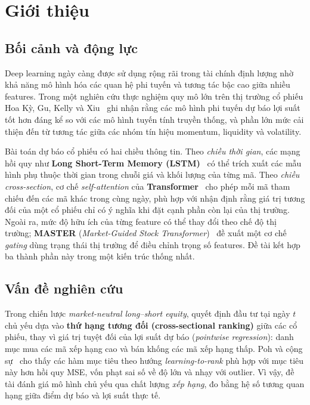 \documentclass[a4paper,12pt]{article}
\begin{document}
\section{Giới thiệu}\label{sec:introduction}

\subsection{Bối cảnh và động lực}
Deep learning ngày càng được sử dụng rộng rãi trong tài chính định lượng nhờ khả năng mô hình hóa các quan hệ phi tuyến và tương tác bậc cao giữa nhiều features. Trong một nghiên cứu thực nghiệm quy mô lớn trên thị trường cổ phiếu Hoa Kỳ, Gu, Kelly và Xiu~\cite{Gu2020} ghi nhận rằng các mô hình phi tuyến dự báo lợi suất tốt hơn đáng kể so với các mô hình tuyến tính truyền thống, và phần lớn mức cải thiện đến từ tương tác giữa các nhóm tín hiệu momentum, liquidity và volatility.

Bài toán dự báo cổ phiếu có hai chiều thông tin. Theo \emph{chiều thời gian}, các mạng hồi quy như \textbf{Long Short-Term Memory (LSTM)}~\cite{FischerKrauss2018} có thể trích xuất các mẫu hình phụ thuộc thời gian trong chuỗi giá và khối lượng của từng mã. Theo \emph{chiều cross-section}, cơ chế \textit{self-attention} của \textbf{Transformer}~\cite{Vaswani2017} cho phép mỗi mã tham chiếu đến các mã khác trong cùng ngày, phù hợp với nhận định rằng giá trị tương đối của một cổ phiếu chỉ có ý nghĩa khi đặt cạnh phần còn lại của thị trường. Ngoài ra, mức độ hữu ích của từng feature có thể thay đổi theo chế độ thị trường; \textbf{MASTER} (\textit{Market-Guided Stock Transformer})~\cite{Li2024MASTER} đề xuất một cơ chế \textit{gating} dùng trạng thái thị trường để điều chỉnh trọng số features. Đề tài kết hợp ba thành phần này trong một kiến trúc thống nhất.

\subsection{Vấn đề nghiên cứu}
Trong chiến lược \textit{market-neutral long--short equity}, quyết định đầu tư tại ngày $t$ chủ yếu dựa vào \textbf{thứ hạng tương đối (cross-sectional ranking)} giữa các cổ phiếu, thay vì giá trị tuyệt đối của lợi suất dự báo (\textit{pointwise regression}): danh mục mua các mã xếp hạng cao và bán khống các mã xếp hạng thấp. Poh và cộng sự~\cite{Poh2021} cho thấy các hàm mục tiêu theo hướng \textit{learning-to-rank} phù hợp với mục tiêu này hơn hồi quy MSE, vốn phạt sai số về độ lớn và nhạy với outlier. Vì vậy, đề tài đánh giá mô hình chủ yếu qua chất lượng \emph{xếp hạng}, đo bằng hệ số tương quan hạng giữa điểm dự báo và lợi suất thực tế.
\end{document}
